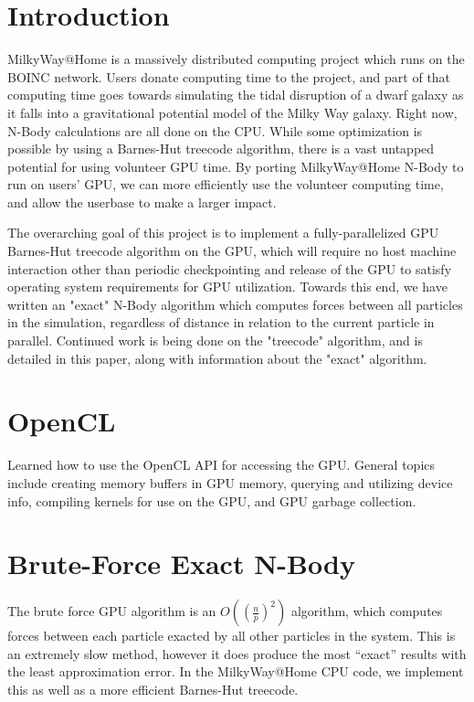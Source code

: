 \documentclass[fleqn,10pt]{SelfArx} %
\begin{document}
\section*{Introduction} %
MilkyWay@Home is a massively distributed computing project which runs on the BOINC network. Users donate computing time to the project, and part of that computing time goes towards simulating the tidal disruption of a dwarf galaxy as it falls into a gravitational potential model of the Milky Way galaxy. Right now, N-Body calculations are all done on the CPU. While some optimization is possible by using a Barnes-Hut treecode algorithm, there is a vast untapped potential for using volunteer GPU time. By porting MilkyWay@Home N-Body to run on users' GPU, we can more efficiently use the volunteer computing time, and allow the userbase to make a larger impact.

The overarching goal of this project is to implement a fully-parallelized GPU Barnes-Hut treecode algorithm on the GPU, which will require no host machine interaction other than periodic checkpointing and release of the GPU to satisfy operating system requirements for GPU utilization. Towards this end, we have written an "exact" N-Body algorithm which computes forces between all particles in the simulation, regardless of distance in relation to the current particle in parallel. Continued work is being done on the "treecode" algorithm, and is detailed in this paper, along with information about the "exact" algorithm.

\section{OpenCL}
Learned how to use the OpenCL API for accessing the GPU. General topics include creating memory buffers in GPU memory, querying and utilizing device info, compiling kernels for use on the GPU, and GPU garbage collection.


\section{Brute-Force Exact N-Body}
The brute force GPU algorithm is an $O\left(\left(\frac{n}{p}\right)^2\right)$ algorithm, which computes forces between each particle exacted by all other particles in the system. This is an extremely slow method, however it does produce the most “exact” results with the least approximation error. In the MilkyWay@Home CPU code, we implement this as well as a more efficient Barnes-Hut treecode.
\end{document}
